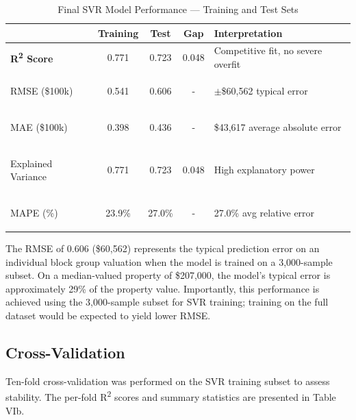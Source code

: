 \documentclass[pdflatex,sn-mathphys-num]{sn-jnl}
\begin{document}
\begin{table}[h]
\centering
\renewcommand{\arraystretch}{1.5}
\setlength{\tabcolsep}{8pt}

\caption{Final SVR Model Performance --- Training and Test Sets}
\begin{tabular}{|>{\bfseries}l|c|c|c|p{4cm}|}
\hline
\rowcolor[HTML]{2F4F7F}
\multicolumn{1}{|>{\color{white}\bfseries}l|}{\color{white} Metric} &
\multicolumn{1}{c|}{\color{white} Training} &
\multicolumn{1}{c|}{\color{white} Test} &
\multicolumn{1}{c|}{\color{white} Gap} &
\multicolumn{1}{l|}{\color{white} Interpretation} \\ \hline

\rowcolor[HTML]{E6E6E6}
R\textsuperscript{2} Score & 0.771 & 0.723 & 0.048 & Competitive fit, no severe overfit \\ \hline

RMSE (\$100k) & 0.541 & 0.606 & - & $\pm$\$60,562 typical error \\ \hline

\rowcolor[HTML]{E6E6E6}
MAE (\$100k) & 0.398 & 0.436 & - & \$43,617 average absolute error \\ \hline

Explained Variance & 0.771 & 0.723 & 0.048 & High explanatory power \\ \hline

\rowcolor[HTML]{E6E6E6}
MAPE (\%) & 23.9\% & 27.0\% & - & 27.0\% avg relative error \\ \hline

\end{tabular}
\end{table}


The RMSE of 0.606 (\$60,562) represents the typical prediction error on an individual block group valuation when the model is trained on a 3,000-sample subset. On a median-valued property of \$207,000, the model's typical error is approximately 29\% of the property value. Importantly, this performance is achieved using the 3,000-sample subset for SVR training; training on the full dataset would be expected to yield lower RMSE.

\subsection{Cross-Validation}
Ten-fold cross-validation was performed on the SVR training subset to assess stability. The per-fold R\textsuperscript{2} scores and summary statistics are presented in Table VIb.
\end{document}
